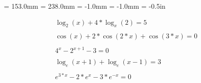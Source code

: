 

\textwidth = 153.0mm
\textheight = 238.0mm
\oddsidemargin = -1.0mm
\evensidemargin = -1.0mm
\topmargin = -0.5in


\begin{huge}
\begin{eqnarray}
\log_2(x)+4*\log_x(2)=5\\
\nonumber\\
\cos(x)+2*\cos(2*x)+\cos(3*x)=0\\
\nonumber\\
4^x - 2^{x+1}-3=0\\
\nonumber\\
\log_e(x+1)+\log_e(x-1)=3\\
\nonumber\\
e^{3*x} - 2*e^x - 3*e^{-x}=0
\end{eqnarray}
\end{huge}
